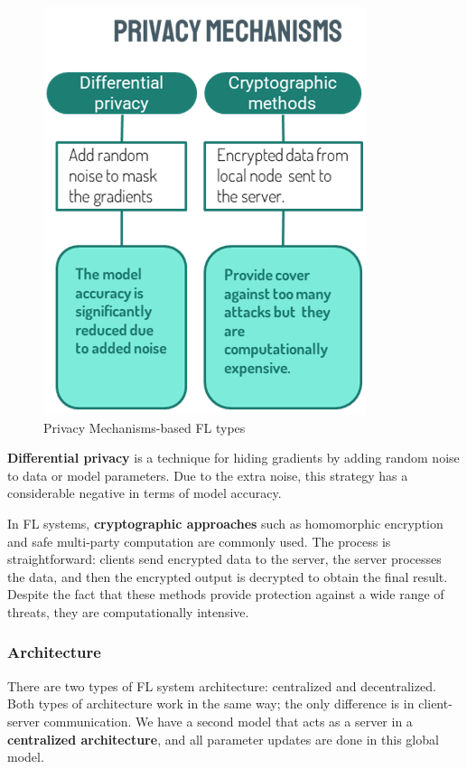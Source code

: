 \begin{figure}[H]
\centering
\includegraphics[scale=0.5]{img/fl_privacy_methods.png}
\caption{Privacy Mechanisms-based FL types}
\label{fig:fl_privacy_methods}
\end{figure}

\textbf{Differential privacy} is a technique for hiding gradients by adding random noise to data or model parameters. Due to the extra noise, this strategy has a considerable negative in terms of model accuracy.

In FL systems, \textbf{cryptographic approaches} such as homomorphic encryption and safe multi-party computation are commonly used. The process is straightforward: clients send encrypted data to the server, the server processes the data, and then the encrypted output is decrypted to obtain the final result. Despite the fact that these methods provide protection against a wide range of threats, they are computationally intensive.

\subsubsection{Architecture}

There are two types of FL system architecture: centralized and decentralized. Both types of architecture work in the same way; the only difference is in client-server communication. We have a second model that acts as a server in a \textbf{centralized architecture}, and all parameter updates are done in this global model. 

